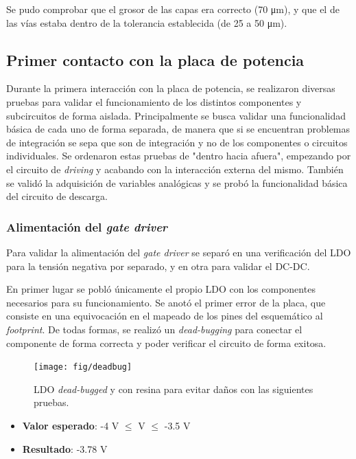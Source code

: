 Se pudo comprobar que el grosor de las capas era correcto (70 \unit{\micro\meter}), y que el de las vías estaba dentro de la tolerancia establecida (de 25 a 50 \unit{\micro\meter}).

\subsection{Primer contacto con la placa de potencia}

Durante la primera interacción con la placa de potencia, se realizaron diversas pruebas para validar el funcionamiento de los distintos componentes y subcircuitos de forma aislada. Principalmente se busca validar una funcionalidad básica de cada uno de forma separada, de manera que si se encuentran problemas de integración se sepa que son de integración y no de los componentes o circuitos individuales. Se ordenaron estas pruebas de "dentro hacia afuera", empezando por el circuito de \textit{driving} y acabando con la interacción externa del mismo. También se validó la adquisición de variables analógicas y se probó la funcionalidad básica del circuito de descarga.


\subsubsection{Alimentación del \textit{gate driver}}

Para validar la alimentación del \textit{gate driver} se separó en una verificación del LDO para la tensión negativa por separado, y en otra para validar el DC-DC.

En primer lugar se pobló únicamente el propio LDO con los componentes necesarios para su funcionamiento. Se anotó el primer error de la placa, que consiste en una equivocación en el mapeado de los pines del esquemático al \textit{footprint}. De todas formas, se realizó un \textit{dead-bugging} para conectar el componente de forma correcta y poder verificar el circuito de forma exitosa.

\begin{figure}[H]
	\centering
	\texttt{[image: fig/deadbug]}
	\caption{LDO \textit{dead-bugged} y con resina para evitar daños con las siguientes pruebas.}
\end{figure}

\begin{itemize}
	\item \textbf{Valor esperado}: -4 V $\le$ V $\le$ -3.5 V
	\item \textbf{Resultado}: -3.78 V
\end{itemize}


